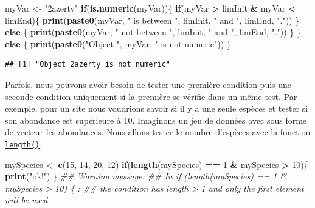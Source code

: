 \documentclass[]{book}
\newenvironment{Shaded}{\begin{snugshade}}{\end{snugshade}}
\newcommand{\CommentTok}[1]{\textcolor[rgb]{0.56,0.35,0.01}{\textit{#1}}}
\newcommand{\ControlFlowTok}[1]{\textcolor[rgb]{0.13,0.29,0.53}{\textbf{#1}}}
\newcommand{\DecValTok}[1]{\textcolor[rgb]{0.00,0.00,0.81}{#1}}
\newcommand{\KeywordTok}[1]{\textcolor[rgb]{0.13,0.29,0.53}{\textbf{#1}}}
\newcommand{\NormalTok}[1]{#1}
\newcommand{\OperatorTok}[1]{\textcolor[rgb]{0.81,0.36,0.00}{\textbf{#1}}}
\newcommand{\StringTok}[1]{\textcolor[rgb]{0.31,0.60,0.02}{#1}}
\begin{document}
\begin{Shaded}
\begin{Highlighting}[]
\NormalTok{myVar <-}\StringTok{ "2azerty"}
\ControlFlowTok{if}\NormalTok{(}\KeywordTok{is.numeric}\NormalTok{(myVar))\{}
  \ControlFlowTok{if}\NormalTok{(myVar }\OperatorTok{>}\StringTok{ }\NormalTok{limInit }\OperatorTok{&}\StringTok{ }\NormalTok{myVar }\OperatorTok{<}\StringTok{ }\NormalTok{limEnd)\{}
    \KeywordTok{print}\NormalTok{(}\KeywordTok{paste0}\NormalTok{(myVar, }\StringTok{" is between "}\NormalTok{, limInit, }\StringTok{" and "}\NormalTok{, limEnd, }\StringTok{"."}\NormalTok{))}
\NormalTok{  \} }\ControlFlowTok{else}\NormalTok{ \{}
    \KeywordTok{print}\NormalTok{(}\KeywordTok{paste0}\NormalTok{(myVar, }\StringTok{" not between "}\NormalTok{, limInit, }\StringTok{" and "}\NormalTok{, limEnd, }\StringTok{"."}\NormalTok{))}
\NormalTok{  \}}
\NormalTok{\} }\ControlFlowTok{else}\NormalTok{ \{}
  \KeywordTok{print}\NormalTok{(}\KeywordTok{paste0}\NormalTok{(}\StringTok{"Object "}\NormalTok{, myVar, }\StringTok{" is not numeric"}\NormalTok{))}
\NormalTok{\}}
\end{Highlighting}
\end{Shaded}

\begin{verbatim}
## [1] "Object 2azerty is not numeric"
\end{verbatim}

Parfois, nous pouvons avoir besoin de tester une première condition puis une seconde condition uniquement si la première se vérifie dans un même test. Par exemple, pour un site nous voudrions savoir si il y a une seule espèces et tester si son abondance est supérieure à 10. Imaginons un jeu de données avec sous forme de vecteur les abondances. Nous allons tester le nombre d'espèces avec la fonction \protect\hyperlink{l015length}{\texttt{length()}}.

\begin{Shaded}
\begin{Highlighting}[]
\NormalTok{mySpecies <-}\StringTok{ }\KeywordTok{c}\NormalTok{(}\DecValTok{15}\NormalTok{, }\DecValTok{14}\NormalTok{, }\DecValTok{20}\NormalTok{, }\DecValTok{12}\NormalTok{)}
\ControlFlowTok{if}\NormalTok{(}\KeywordTok{length}\NormalTok{(mySpecies) }\OperatorTok{==}\StringTok{ }\DecValTok{1} \OperatorTok{&}\StringTok{ }\NormalTok{mySpecies }\OperatorTok{>}\StringTok{ }\DecValTok{10}\NormalTok{)\{}
  \KeywordTok{print}\NormalTok{(}\StringTok{"ok!"}\NormalTok{)}
\NormalTok{\}}
\CommentTok{## Warning message:}
\CommentTok{## In if (length(mySpecies) == 1 & mySpecies > 10) \{ :}
\CommentTok{##   the condition has length > 1 and only the first element will be used}
\end{Highlighting}
\end{Shaded}
\end{document}
